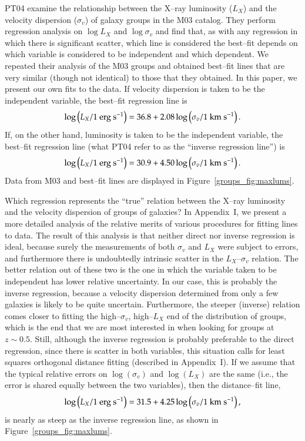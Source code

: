 PT04 examine the relationship between the X--ray luminosity ($L_X$)
and the velocity dispersion ($\sigma_v$) of galaxy groups in the M03
catalog.  They perform regression analysis on $\log L_X$ and $\log
\sigma_v$ and find that, as with any regression in which there is
significant scatter, which line is considered the best--fit depends on
which variable is considered to be independent and which dependent.
We repeated their analysis of the M03 groups and obtained best--fit
lines that are very similar (though not identical) to those that they
obtained.  In this paper, we present our own fits to the data.  If
velocity dispersion is taken to be the independent variable, the
best--fit regression line is
\begin{equation}
\label{groups_eq:M03D}
\log \left(L_X / 1 {\rm~erg~s^{-1}}\right) = 36.8 + 2.08 \log \left( \sigma_v / 1 {\rm~km~s^{-1}} \right).
\end{equation}
If, on the other hand, luminosity is taken to be the independent variable,
the best--fit regression line (what PT04 refer to as the ``inverse regression
line'') is
\begin{equation}
\label{groups_eq:M03I}
\log \left(L_X / 1 {\rm~erg~s^{-1}}\right) = 30.9 + 4.50 \log \left( \sigma_v / 1 {\rm~km~s^{-1}} \right).
\end{equation}
Data from M03 and best--fit lines are displayed in
Figure~\ref{groups_fig:maxlums}.

Which regression represents the ``true'' relation between the X--ray
luminosity and the velocity dispersion of groups of galaxies?  In
Appendix~I, we present a more detailed analysis of the relative merits
of various procedures for fitting lines to data.  The result of this
analysis is that neither direct nor inverse regression is ideal,
because surely the measurements of both $\sigma_v$ and $L_X$ were
subject to errors, and furthermore there is undoubtedly intrinsic
scatter in the $L_X$--$\sigma_v$ relation.  The better relation out of
these two is the one in which the variable taken to be independent has
lower relative uncertainty.  In our case, this is probably the inverse
regression, because a velocity dispersion determined from only a few
galaxies is likely to be quite uncertain.  Furthermore, the steeper
(inverse) relation comes closer to fitting the high--$\sigma_v$,
high--$L_X$ end of the distribution of groups, which is the end that
we are most interested in when looking for groups at $z\sim 0.5$.
Still, although the inverse regression is probably preferable to the
direct regression, since there is scatter in both variables, this
situation calls for least squares orthogonal distance fitting
(described in Appendix~I).  If we assume that the typical relative
errors on $\log(\sigma_v)$ and $\log(L_X)$ are the same (i.e., the
error is shared equally between the two variables), then the
distance--fit line,
\begin{equation}
\log \left(L_X / 1 {\rm~erg~s^{-1}}\right) = 31.5 + 4.25 \log \left( \sigma_v / 1 {\rm~km~s^{-1}} \right),
\label{groups_eq:distfit}
\end{equation}
is nearly as steep as the inverse regression line, as shown in
Figure~\ref{groups_fig:maxlums}.


